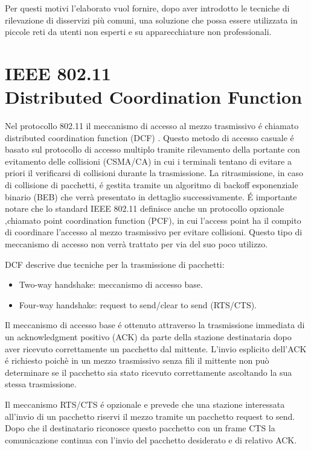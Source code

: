 Per questi motivi l'elaborato vuol fornire, dopo aver introdotto le tecniche di rilevazione di disservizi pi\`u comuni, una soluzione che possa essere utilizzata in piccole reti da utenti non esperti e su apparecchiature non professionali.

\section[IEEE 802.11 Distributed Coordination Function]{IEEE 802.11 \\Distributed Coordination Function}
Nel protocollo 802.11 il meccanismo di accesso al mezzo trasmissivo \'e chiamato distributed coordination function (DCF) \cite{ieee99}.
Questo metodo di accesso casuale \'e basato sul protocollo di accesso multiplo tramite rilevamento della portante con evitamento delle collisioni (CSMA/CA) in cui i terminali tentano di evitare a priori il verificarsi di collisioni durante la trasmissione.
La ritrasmissione, in caso di collisione di pacchetti, \'e gestita tramite un algoritmo di backoff esponenziale binario (BEB) che verr\`a presentato in dettaglio successivamente.
\'E importante notare che lo standard IEEE 802.11 definisce anche un  protocollo opzionale ,chiamato point coordination function (PCF), in cui l'access point ha il compito di coordinare l'accesso al mezzo trasmissivo per evitare collisioni. 
Questo tipo di meccanismo di accesso non verr\`a trattato per via del suo poco utilizzo.

DCF descrive due tecniche per la trasmissione di pacchetti:
\begin{itemize}
 \item Two-way handshake: meccanismo di accesso base.
 \item Four-way handshake: request to send/clear to send (RTS/CTS).
\end{itemize}

Il meccanismo di accesso base \'e ottenuto attraverso la trasmissione immediata di un acknowledgment positivo (ACK) da parte della stazione destinataria dopo aver ricevuto correttamente un pacchetto dal mittente.
L'invio esplicito dell'ACK \'e richiesto poich\`e in un mezzo trasmissivo senza fili il mittente non pu\`o determinare se il pacchetto sia stato ricevuto correttamente ascoltando la sua stessa trasmissione.

Il meccanismo RTS/CTS \'e opzionale e prevede che una stazione interessata all'invio di un pacchetto riservi il mezzo tramite un pacchetto request to send.
Dopo che il destinatario riconosce questo pacchetto con un frame CTS la comunicazione continua con l'invio del pacchetto desiderato e di relativo ACK.

